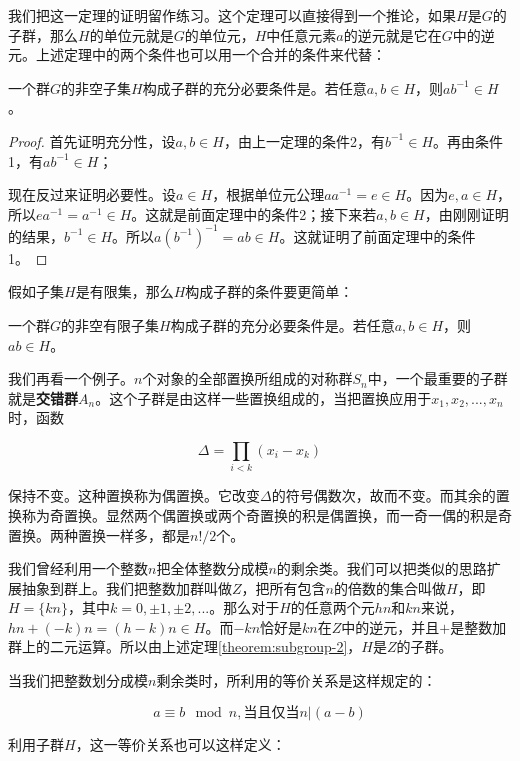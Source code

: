 \documentclass[b5paper]{ctexart}
\begin{document}
我们把这一定理的证明留作练习。这个定理可以直接得到一个推论，如果$H$是$G$的子群，那么$H$的单位元就是$G$的单位元，$H$中任意元素$a$的逆元就是它在$G$中的逆元。上述定理中的两个条件也可以用一个合并的条件来代替：

\begin{theorem}
一个群$G$的非空子集$H$构成子群的充分必要条件是。若任意$a, b \in H$，则$ab^{-1} \in H$。
\label{theorem:subgroup-2}
\end{theorem}

\begin{proof}
首先证明充分性，设$a, b \in H$，由上一定理的条件2，有$b^{-1} \in H$。再由条件1，有$ab^{-1} \in H$；

现在反过来证明必要性。设$a \in H$，根据单位元公理$aa^{-1} = e \in H$。因为$e, a \in H$，所以$ea^{-1} = a^{-1} \in H$。这就是前面定理中的条件2；接下来若$a, b \in H$，由刚刚证明的结果，$b^{-1} \in H$。所以$a(b^{-1})^{-1} = ab \in H$。这就证明了前面定理中的条件1。
\end{proof}

假如子集$H$是有限集，那么$H$构成子群的条件要更简单：

\begin{theorem}
一个群$G$的非空有限子集$H$构成子群的充分必要条件是。若任意$a, b \in H$，则$ab \in H$。
\end{theorem}

我们再看一个例子。$n$个对象的全部置换所组成的对称群$S_n$中，一个最重要的子群就是\textbf{交错群}$A_n$。这个子群是由这样一些置换组成的，当把置换应用于$x_1, x_2, ..., x_n$时，函数

\[
\Delta = \displaystyle \prod_{i < k} (x_i - x_k)
\]

保持不变。这种置换称为偶置换。它改变$\Delta$的符号偶数次，故而不变。而其余的置换称为奇置换。显然两个偶置换或两个奇置换的积是偶置换，而一奇一偶的积是奇置换。两种置换一样多，都是$n!/2$个。

我们曾经利用一个整数$n$把全体整数分成模$n$的剩余类。我们可以把类似的思路扩展抽象到群上。我们把整数加群叫做$Z$，把所有包含$n$的倍数的集合叫做$H$，即$H = \{ kn \}$，其中$k = 0, \pm 1, \pm 2, ...$。那么对于$H$的任意两个元$hn$和$kn$来说，$hn + (-k)n = (h - k)n \in H$。而$-kn$恰好是$kn$在$Z$中的逆元，并且$+$是整数加群上的二元运算。所以由上述定理\ref{theorem:subgroup-2}，$H$是$Z$的子群。

当我们把整数划分成模$n$剩余类时，所利用的等价关系是这样规定的：

\[
a \equiv b \mod n, \text{当且仅当} n | (a - b)
\]

利用子群$H$，这一等价关系也可以这样定义：
\end{document}
